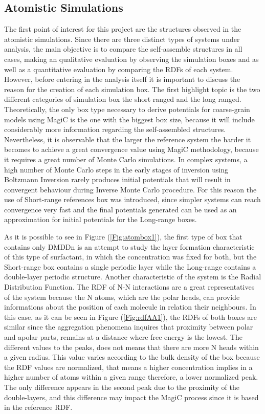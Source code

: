 \documentclass[10pt,a4paper,twoside]{article}
\begin{document}
\subsection{Atomistic Simulations}
\label{sec:atmbxdiss}
The first point of interest for this project are the structures observed in the atomistic simulations. Since there are three distinct types of systems under analysis, the main objective is to compare the self-assemble structures in all cases, making an qualitative evaluation by observing the simulation boxes and as well as a quantitative evaluation by comparing the RDFs of each system. However, before entering in the analysis itself it is important to discuss the reason for the creation of each simulation box. The first highlight topic is the two different categories of simulation box the short ranged and the long ranged. Theoretically, the only box type necessary to derive potentials for coarse-grain models using MagiC is the one with the biggest box size, because it will include considerably more information regarding the self-assembled structures. Nevertheless, it is observable that the larger the reference system the harder it becomes to achieve a great convergence value using MagiC methodology, because it requires a great number of Monte Carlo simulations. In complex systems, a high number of Monte Carlo steps in the early stages of inversion using Boltzmann Inversion rarely produces initial potentials that will result in convergent behaviour during Inverse Monte Carlo procedure. For this reason the use of Short-range references box was introduced, since simpler systems can reach convergence very fast and the final potentials generated can be used as an approximation for initial potentials for the Long-range boxes.

As it is possible to see in Figure (\ref{Fig:atombox1}), the first type of box that contains only DMDDn is an attempt to study the layer formation characteristic of this type of surfactant, in which the concentration was fixed for both, but the Short-range box contains a single periodic layer while the Long-range contains a double-layer periodic structure. Another characteristic of the system is the Radial Distribution Function. The RDF of N-N interactions are a great representatives of the system because the N atoms, which are the polar heads, can provide informations about the position of each molecule in relation their neighbours. In this case, as it can be seen in Figure (\ref{Fig:rdfAA1}), the RDFs of both boxes are similar since the aggregation phenomena inquires that proximity between polar and apolar parts, remains at a distance where free energy is the lowest. The different values to the peaks, does not means that there are more N heads within a given radius. This value varies according to the bulk density of the box because the RDF values are normalized, that means a higher concentration implies in a higher number of atoms within a given range  therefore, a lower normalized peak. The only difference appears in the second peak due to the proximity of the double-layers, and this difference may impact the MagiC process since it is based in the reference RDF.
\end{document}
